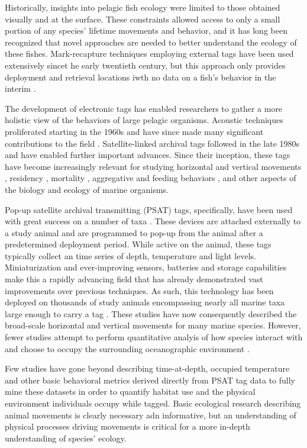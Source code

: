 Historically, insights into pelagic fish ecology were limited to those obtained visually and at the surface. These constraints allowed access to only a small portion of any species' lifetime movements and behavior, and it has long been recognized that novel approaches are needed to better understand the ecology of these fishes. Mark-recapture techniques employing external tags have been used extensively sincet he early twentieth century, but this approach only provides deployment and retrieval locations iwth no data on a fish's behavior in the interim \citep{Kohler2001}.

The development of electronic tags has enabled researchers to gather a more holistic view of the behaviors of large pelagic organisms. Acoustic techniques proliferated starting in the 1960s and have since made many significant contributions to the field \citep[\eg][]{Carey1981}. Satellite-linked archival tags followed in the late 1980s and have enabled further important advances. Since their inception, these tags have become increasingly relevant \citep{Hussey2015} for studying horizontal and vertical movements \citep{Block2011, Thorrold2014a, Berumen2014}, residency \citep{Domeier2006}, mortality \citep{Musyl2011a}, aggregative and feeding behaviors \citep{Jorgensen2012}, and other aspects of the biology and ecology of marine organisms.

Pop-up satellite archival transmitting (PSAT) tags, specifically, have been used with great success on a number of taxa \citep{Hussey2015}. These devices are attached externally to a study animal and are programmed to pop-up from the animal after a predetermined deployment period. While active on the animal, these tags typically collect an \is time series of depth, temperature and light levels. Miniaturization and ever-improving sensors, batteries and storage capabilities make this a rapidly advancing field that has already demonstrated vast improvements over previous techniques. As such, this technology has been deployed on thousands of study animals encompassing nearly all marine taxa large enough to carry a tag \citep{Hussey2015}. These studies have now consequently described the broad-scale horizontal and vertical movements for many marine species. However, fewer studies attempt to perform quantitative analyis of how species interact with and choose to occupy the surrounding oceanographic environment \citep[except see, for example, ][]{Lawson2010}.

Few studies have gone beyond describing time-at-depth, occupied temperature and other basic behavioral metrics derived directly from PSAT tag data to fully mine these datasets in order to quantify habitat use and the physical environment individuals occupy while tagged. Basic ecological research describing animal movements is clearly necessary adn informative, but an understanding of physical processes driving movements is critical for a more in-depth understanding of species' ecology.

